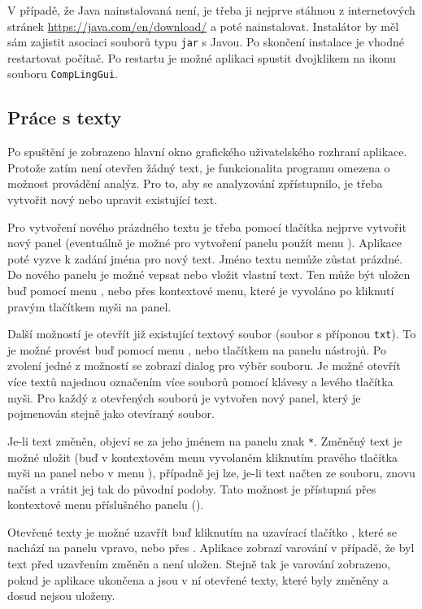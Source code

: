 \documentclass[dp.tex]{subfiles}
\begin{document}
V případě, že Java nainstalovaná není, je třeba ji nejprve stáhnou z internetových stránek \url{https://java.com/en/download/} a poté nainstalovat. Instalátor by měl sám zajistit asociaci souborů typu \texttt{jar} s Javou. Po skončení instalace je vhodné restartovat počítač. Po restartu je možné aplikaci spustit dvojklikem na ikonu souboru \texttt{CompLingGui}.

\subsection{Práce s texty}

Po spuštění je zobrazeno hlavní okno grafického uživatelského rozhraní aplikace. Protože zatím není otevřen žádný text, je funkcionalita programu omezena o možnost provádění analýz. Pro to, aby se analyzování zpřístupnilo, je třeba vytvořit nový nebo upravit existující text.

Pro vytvoření nového prázdného textu je třeba pomocí tlačítka  nejprve vytvořit nový panel (eventuálně je možné pro vytvoření panelu použít menu ). Aplikace poté vyzve k zadání jména pro nový text. Jméno textu nemůže zůstat prázdné. Do nového panelu je možné vepsat nebo vložit vlastní text. Ten může být uložen buď pomocí menu , nebo přes kontextové menu, které je vyvoláno po kliknutí pravým tlačítkem myši na panel.

Další možností je otevřít již existující textový soubor (soubor s příponou \texttt{txt}). To je možné provést buď pomocí menu , nebo tlačítkem  na panelu nástrojů. Po zvolení jedné z možností se zobrazí dialog pro výběr souboru. Je možné otevřít více textů najednou označením více souborů pomocí klávesy \keys{\ctrl} a levého tlačítka myši. Pro každý z otevřených souborů je vytvořen nový panel, který je pojmenován stejně jako otevíraný soubor.

Je-li text změněn, objeví se za jeho jménem na panelu znak \texttt{*}. Změněný text je možné uložit (buď v kontextovém menu vyvolaném kliknutím pravého tlačítka myši na panel nebo v menu ), případně jej lze, je-li text načten ze souboru, znovu načíst a vrátit jej tak do původní podoby. Tato možnost je přístupná přes kontextové menu příslušného panelu ().

Otevřené texty je možné uzavřít buď kliknutím na uzavírací tlačítko , které se nachází na panelu vpravo, nebo přes . Aplikace zobrazí varování v případě, že byl text před uzavřením změněn a není uložen. Stejně tak je varování zobrazeno, pokud je aplikace ukončena a jsou v ní otevřené texty, které byly změněny a dosud nejsou uloženy.
\end{document}
